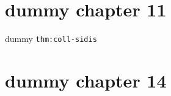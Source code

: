 \clearpage\begingroup\small
\setcounter{chapter}{11}\addtocounter{chapter}{-1}
\chapter{dummy chapter 11}
\begin{theorem}\label{thm:coll-sidis}dummy \texttt{thm:coll-sidis}\end{theorem}
\setcounter{chapter}{14}\addtocounter{chapter}{-1}
\chapter{dummy chapter 14}\label{ch:tmd}
\endgroup
